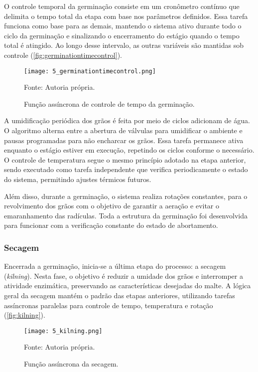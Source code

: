 O controle temporal da germinação consiste em um cronômetro contínuo que delimita o tempo total da etapa com base nos parâmetros definidos. Essa tarefa funciona como base para as demais, mantendo o sistema ativo durante todo o ciclo da germinação e sinalizando o encerramento do estágio quando o tempo total é atingido. Ao longo desse intervalo, as outras variáveis são mantidas sob controle (\autoref{fig:germinationtimecontrol}).

\begin{figure}[ht]
    \centering
    \caption{Função assíncrona de controle de tempo da germinação.}
    \label{fig:germinationtimecontrol}
    \texttt{[image: 5\_germinationtimecontrol.png]}

    {\centering\footnotesize Fonte: Autoria própria.\par}
\end{figure}

A umidificação periódica dos grãos é feita por meio de ciclos adicionam de água. O algoritmo alterna entre a abertura de válvulas para umidificar o ambiente e pausas programadas para não encharcar os grãos. Essa tarefa permanece ativa enquanto o estágio estiver em execução, repetindo os ciclos conforme o necessário. O controle de temperatura segue o mesmo princípio adotado na etapa anterior, sendo executado como tarefa independente que verifica periodicamente o estado do sistema, permitindo ajustes térmicos futuros.

Além disso, durante a germinação, o sistema realiza rotações constantes, para o revolvimento dos grãos com o objetivo de garantir a aeração e evitar o emaranhamento das radículas. Toda a estrutura da germinação foi desenvolvida para funcionar com a verificação constante do estado de abortamento.

\subsubsection{Secagem}

Encerrada a germinação, inicia-se a última etapa do processo: a secagem (\textit{kilning}). Nesta fase, o objetivo é reduzir a umidade dos grãos e interromper a atividade enzimática, preservando as características desejadas do malte. A lógica geral da secagem mantém o padrão das etapas anteriores, utilizando tarefas assíncronas paralelas para controle de tempo, temperatura e rotação (\autoref{fig:kilning}).

\begin{figure}[ht]
    \centering
    \caption{Função assíncrona da secagem.}
    \label{fig:kilning}
    \texttt{[image: 5\_kilning.png]}

    {\centering\footnotesize Fonte: Autoria própria.\par}
\end{figure}

